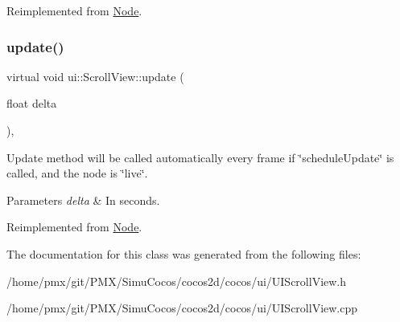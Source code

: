 Reimplemented from \hyperlink{classNode_a32878481ba54b3856ab53c10af13848e}{Node}.

\mbox{\label{classui_1_1ScrollView_a4daad841add32c92b12e8c4c909b2b2e}} 
\subsubsection{\texorpdfstring{update()}{update()}\hspace{0.1cm}{\footnotesize\ttfamily [2/2]}}
{\footnotesize\ttfamily virtual void ui\+::\+Scroll\+View\+::update (\begin{DoxyParamCaption}\item[{float}]{delta }\end{DoxyParamCaption})\hspace{0.3cm}{\ttfamily [override]}, {\ttfamily [virtual]}}

Update method will be called automatically every frame if \char`\"{}schedule\+Update\char`\"{} is called, and the node is \char`\"{}live\char`\"{}. 
\begin{DoxyParams}{Parameters}
{\em delta} & In seconds. \\
\hline
\end{DoxyParams}


Reimplemented from \hyperlink{classNode_a32878481ba54b3856ab53c10af13848e}{Node}.



The documentation for this class was generated from the following files\+:\begin{DoxyCompactItemize}
\item 
/home/pmx/git/\+P\+M\+X/\+Simu\+Cocos/cocos2d/cocos/ui/U\+I\+Scroll\+View.\+h\item 
/home/pmx/git/\+P\+M\+X/\+Simu\+Cocos/cocos2d/cocos/ui/U\+I\+Scroll\+View.\+cpp\end{DoxyCompactItemize}
